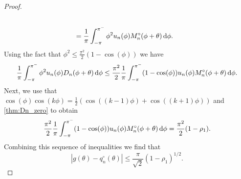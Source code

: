 \begin{proof}
\begin{align*}
        \\&=\frac{1}{\pi} \int_{-\pi}^{\pi^-} \phi^2 u_n(\phi) M_n^\circ(\phi+\theta) \,\textup{d}\phi.
    \end{align*}
    Using the fact that  \( \phi^2 \leq \frac{\pi^2}{2} (1 -\cos(\phi)) \) we have 
    \begin{equation*}
        \frac{1}{\pi} \int_{-\pi}^{\pi^-} \phi^2 u_n(\phi) D_n(\phi+\theta) \,\textup{d}\phi
        \leq \frac{\pi^2}{2} \frac{1}{\pi} \int_{-\pi}^{\pi^-} (1-\cos(\phi)) u_n(\phi) M_n^\circ(\phi+\theta) \,\textup{d}\phi.
    \end{equation*}
    Next, we use that \( \cos(\phi) \cos(k\phi) = \frac{1}{2}( \cos((k-1)\phi) + \cos((k+1)\phi)) \) and \cref{thm:Dn_zero} to obtain
    \begin{equation*} 
        \frac{\pi^2}{2} \frac{1}{\pi} \int_{-\pi}^{\pi^-} (1-\cos(\phi)) u_n(\phi) M_n^\circ(\phi+\theta) \,\textup{d}\phi
        = \frac{\pi^2}{2} (1 - \rho_{1}).
    \end{equation*}  
    Combining this sequence of inequalities we find that
    \begin{equation*}
        |g(\theta) - q_n^\circ(\theta)| \leq \frac{\pi}{\sqrt{2}} ( 1 - \rho_{1})^{1/2}. \tag*{\qedhere}
    \end{equation*} 
\end{proof}


